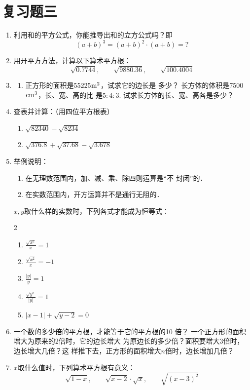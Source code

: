 \section*{复习题三}
\begin{enumerate}
    \item 利用和的平方公式，你能推导出和的立方公式吗？即
    \[(a+b)^3=(a+b)^2\cdot (a+b)=?\]
    \item 用开平方方法，计算以下算术平方根：
    $$\sqrt{0.7744},\qquad \sqrt{9880.36},\qquad \sqrt{100.4004}$$
  \item 
    \begin{enumerate}
        \item 正方形的面积是55225${\rm m^2}$，试求它的边长是
多少？
\staritem 长方体的体积是7500${\rm cm^3}$，长、宽、高的比
是$5:4:3$. 试求长方体的长、宽、高各是多少？
    \end{enumerate}
    
    
\item 查表并计算：（用四位平方根表）
\begin{enumerate}
    \item $\sqrt{82340}-\sqrt{8234}$
    \item $\sqrt{376.8}+\sqrt{37.68} -\sqrt{3.678}$
\end{enumerate}

\item 举例说明：
\begin{enumerate}
    \item 在无理数范围内，加、减、乘、除四则运算是“不
封闭”的．
\item 在实数范围内，开方运算并不是通行无阻的．
\end{enumerate}

\staritem $x,y$取什么样的实数时，下列各式才能成为恒等式：
\begin{multicols}{2}
    \begin{enumerate}
        \item $\frac{\sqrt{x^2}}{x}=1$
        \item $\frac{\sqrt{x^2}}{x}=-1$
        \item $\frac{|y|}{y}=1$
        \item $\frac{\sqrt{y^2}}{|y|}=1$
        \item $|x-1|+\sqrt{y-2}=0$
    \end{enumerate}
\end{multicols}



\item 一个数的多少倍的平方根，才能等于它的平方根的10
倍？
\staritem 一个正方形的面积增大为原来的2倍时，它的边长增大
为原边长的多少倍？面积要增大3倍时，边长增大几倍？这
样推下去，正方形的面积增大$n$倍时，边长增加几倍？
\item $x$取什么值时，下列算术平方根有意义：
\[\sqrt{1-x},\qquad \sqrt{x-2}\cdot \sqrt{x},\qquad \sqrt{(x-3)^2}  \]


\end{enumerate}
